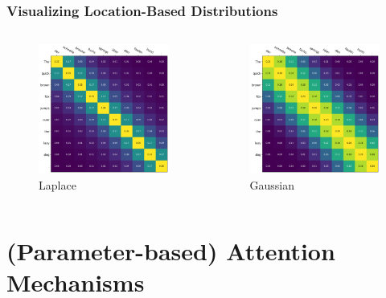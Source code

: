 \documentclass[usenames,dvipsnames]{beamer}
\begin{document}
\begin{frame}
\frametitle{Visualizing Location-Based Distributions}
\begin{columns}
  \begin{column}{0.45\textwidth}
    \begin{figure}
      \centering
      \includegraphics[width=4.75cm, valign=c]{assets/laplace}
      \caption{Laplace}
    \end{figure}
  \end{column}
  \begin{column}{0.45\textwidth}
    \begin{figure}
      \centering
      \includegraphics[width=4.75cm, valign=c]{assets/normal}
      \caption{Gaussian}
    \end{figure}
  \end{column}

\end{columns}
\end{frame}
\section{(Parameter-based) Attention Mechanisms}
\end{document}
